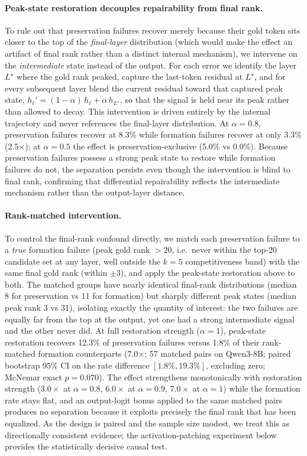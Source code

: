 \documentclass{article} %
\begin{document}
\paragraph{Peak-state restoration decouples repairability from final rank.}
To rule out that preservation failures recover merely because their gold token sits closer to the top of the \emph{final-layer} distribution (which would make the effect an artifact of final rank rather than a distinct internal mechanism), we intervene on the \emph{intermediate} state instead of the output. For each error we identify the layer $L^\star$ where the gold rank peaked, capture the last-token residual at $L^\star$, and for every subsequent layer blend the current residual toward that captured peak state, $h_\ell' = (1-\alpha)\,h_\ell + \alpha\,h_{L^\star}$, so that the signal is held near its peak rather than allowed to decay. This intervention is driven entirely by the internal trajectory and never references the final-layer distribution. At $\alpha = 0.8$, preservation failures recover at 8.3\% while formation failures recover at only 3.3\% (2.5$\times$); at $\alpha = 0.5$ the effect is preservation-exclusive (5.0\% vs 0.0\%). Because preservation failures possess a strong peak state to restore while formation failures do not, the separation persists even though the intervention is blind to final rank, confirming that differential repairability reflects the intermediate mechanism rather than the output-layer distance.

\paragraph{Rank-matched intervention.}
To control the final-rank confound directly, we match each preservation failure to a \emph{true} formation failure (peak gold rank $> 20$, i.e.\ never within the top-20 candidate set at any layer, well outside the $k=5$ competitiveness band) with the same final gold rank (within $\pm 3$), and apply the peak-state restoration above to both. The matched groups have nearly identical final-rank distributions (median 8 for preservation vs 11 for formation) but sharply different peak states (median peak rank 3 vs 31), isolating exactly the quantity of interest: the two failures are equally far from the top at the output, yet one had a strong intermediate signal and the other never did. At full restoration strength ($\alpha = 1$), peak-state restoration recovers 12.3\% of preservation failures versus 1.8\% of their rank-matched formation counterparts (7.0$\times$; 57 matched pairs on Qwen3-8B; paired bootstrap 95\% CI on the rate difference $[1.8\%, 19.3\%]$, excluding zero; McNemar exact $p = 0.070$). The effect strengthens monotonically with restoration strength ($3.0\times$ at $\alpha = 0.8$, $6.0\times$ at $\alpha = 0.9$, $7.0\times$ at $\alpha = 1$) while the formation rate stays flat, and an output-logit bonus applied to the same matched pairs produces no separation because it exploits precisely the final rank that has been equalized. As the design is paired and the sample size modest, we treat this as directionally consistent evidence; the activation-patching experiment below provides the statistically decisive causal test.
\end{document}
